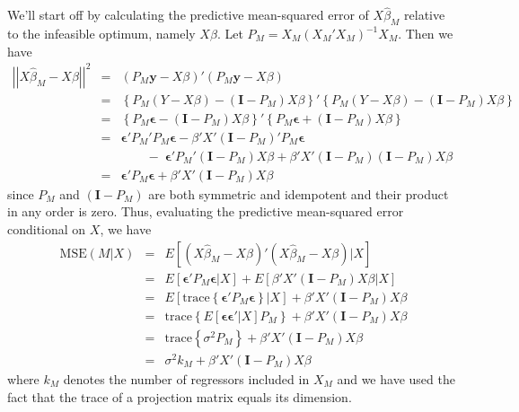 \documentclass[12pt]{article}
\theoremstyle{definition}
\begin{document}
We'll start off by calculating the predictive mean-squared error of $X\widehat{\beta}_M$ relative to the infeasible optimum, namely $X\beta$. Let $P_M = X_M(X_M'X_M)^{-1}X_M$. Then we have
\begin{eqnarray*}
	\left|\left|X\widehat{\beta}_M - X\beta\right|\right|^2 &=& (P_M \mathbf{y} - X\beta)'(P_M \mathbf{y} - X\beta)\\
		&=&\left\{P_M(Y-X\beta) - (\mathbf{I} - P_M)X\beta \right\}' \left\{P_M(Y-X\beta) - (\mathbf{I} - P_M)X\beta  \right\}\\
		&=&\left\{ P_M \boldsymbol{\epsilon} - (\mathbf{I}- P_M)X\beta\right\}'\left\{ P_M \boldsymbol{\epsilon} + (\mathbf{I}- P_M)X\beta \right\}\\
		&=&\boldsymbol{\epsilon}'P_M'P_M \boldsymbol{\epsilon} - \beta'X'(\mathbf{I}-P_M)'P_M\boldsymbol{\epsilon} \\
			&&\quad \quad - \;\boldsymbol{\epsilon}'P_M'(\mathbf{I} - P_M)X\beta + \beta'X' (\mathbf{I} - P_M)(\mathbf{I} - P_M)X\beta\\
		&=& \boldsymbol{\epsilon}'P_M \boldsymbol{\epsilon} + \beta'X'(\mathbf{I} - P_M)X\beta
\end{eqnarray*}
since $P_M$ and $(\mathbf{I} - P_M)$ are both symmetric and idempotent and their product in any order is zero. Thus, evaluating the predictive mean-squared error conditional on $X$, we have
	\begin{eqnarray*}
		\mbox{MSE}(M|X) &=& E\left[(X\widehat{\beta}_M - X\beta)'(X\widehat{\beta}_M - X\beta)|X \right]\\
		 &=& E\left[\boldsymbol{\epsilon}'P_M \boldsymbol{\epsilon}|X\right] + E\left[\beta'X'(\mathbf{I} - P_M)X\beta |X\right]\\
			&=&E\left[\mbox{trace}\left\{\boldsymbol{\epsilon}'P_M \boldsymbol{\epsilon}\right\}|X\right] + \beta'X'(\mathbf{I} - P_M)X\beta \\
		&=&\mbox{trace}\left\{E[\boldsymbol{\epsilon} \boldsymbol{\epsilon}'|X]P_M\right\} + \beta'X'(\mathbf{I} - P_M)X\beta \\
	&=&\mbox{trace}\left\{\sigma^2 P_M\right\} + \beta'X'(\mathbf{I} - P_M)X\beta \\
	&=& \sigma^2 k_M + \beta'X'(\mathbf{I} - P_M)X\beta
	\end{eqnarray*}
where $k_M$ denotes the number of regressors included in $X_M$ and we have used the fact that the trace of a projection matrix equals its dimension. 
\end{document}

